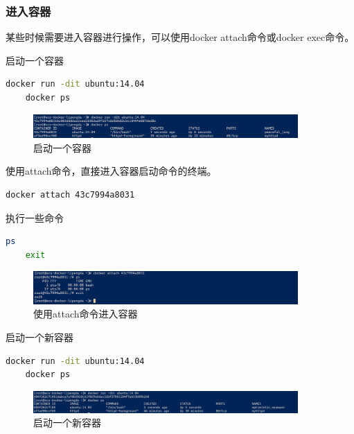 \documentclass{article}
\begin{document}
\subsubsection{进入容器}

某些时候需要进入容器进行操作，可以使用docker attach命令或docker exec命令。

启动一个容器

\begin{lstlisting}[language=bash]
    docker run -dit ubuntu:14.04
    docker ps 
\end{lstlisting}

\begin{figure}[H]
\centering
\includegraphics[width=0.9\textwidth]{img/0.2.4.3.1.png}
\caption{启动一个容器}
\end{figure}

使用attach命令，直接进入容器启动命令的终端。

\begin{lstlisting}[language=bash]
    docker attach 43c7994a8031
\end{lstlisting}

执行一些命令

\begin{lstlisting}[language=bash]
    ps
    exit
\end{lstlisting}

\begin{figure}[H]
\centering
\includegraphics[width=0.9\textwidth]{img/0.2.4.3.2.png}
\caption{使用attach命令进入容器}
\end{figure}

启动一个新容器

\begin{lstlisting}[language=bash]
    docker run -dit ubuntu:14.04
    docker ps
\end{lstlisting}

\begin{figure}[H]
\centering
\includegraphics[width=0.9\textwidth]{img/0.2.4.3.3.png}
\caption{启动一个新容器}
\end{figure}
\end{document}
